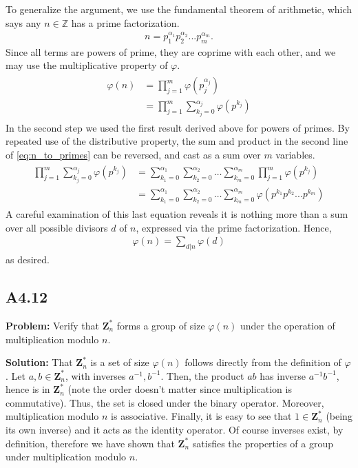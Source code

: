 \documentclass{article}
\begin{document}
To generalize the argument, we use the fundamental theorem of arithmetic, which says any $n\in \mathbb{Z}$ has a prime factorization.
\begin{align}
    n = p_1^{\alpha_1}p_2^{\alpha_2}...p_m^{\alpha_m}.
\end{align}
Since all terms are powers of prime, they are coprime with each other, and we may use the multiplicative property of $\varphi$.
\begin{align} \label{eq:n_to_primes}
\begin{aligned}
    \varphi(n) &= \prod_{j=1}^{m}\varphi(p_j^{\alpha_j}) \\
    &= \prod_{j=1}^m \sum_{k_j=0}^{\alpha_j}\varphi(p^{k_j})
\end{aligned}
\end{align}
In the second step we used the first result derived above for powers of primes. By repeated use of the distributive property, the sum and product in the second line of \eqref{eq:n_to_primes} can be reversed, and cast as a sum over $m$ variables.
\begin{align}
\begin{aligned}
    \prod_{j=1}^m \sum_{k_j=0}^{\alpha_j}\varphi(p^{k_j}) &= \sum_{k_1=0}^{\alpha_1}\sum_{k_2=0}^{\alpha_2} \dots \sum_{k_m=0}^{\alpha_m} \prod_{j=1}^m \varphi(p^{k_j}) \\
    &= \sum_{k_1=0}^{\alpha_1}\sum_{k_2=0}^{\alpha_2} \dots \sum_{k_m=0}^{\alpha_m} \varphi(p^{k_1}p^{k_2}...p^{k_m})
\end{aligned}
\end{align}
A careful examination of this last equation reveals it is nothing more than a sum over all possible divisors $d$ of $n$, expressed via the prime factorization. Hence,
\begin{align}
    \varphi(n) = \sum_{d|n} \varphi(d)
\end{align}
as desired.

\subsection*{A4.12}
\textbf{Problem:} Verify that $\textbf{Z}_n^*$ forms a group of size $\varphi(n)$ under the operation of multiplication modulo $n$.

\textbf{Solution:} That $\textbf{Z}_n^*$ is a set of size $\varphi(n)$ follows directly from the definition of $\varphi$. Let $a,b \in \textbf{Z}_n^*$, with inverses $a^{-1}, b^{-1}$. Then, the product $ab$ has inverse $a^{-1}b^{-1}$, hence is in $\textbf{Z}_n^*$ (note the order doesn't matter since multiplication is commutative). Thus, the set is closed under the binary operator. Moreover, multiplication modulo $n$ is associative. Finally, it is easy to see that $1\in \textbf{Z}_n^*$ (being its own inverse) and it acts as the identity operator. Of course inverses exist, by definition, therefore we have shown that $\textbf{Z}_n^*$ satisfies the properties of a group under multiplication modulo $n$.
\end{document}
